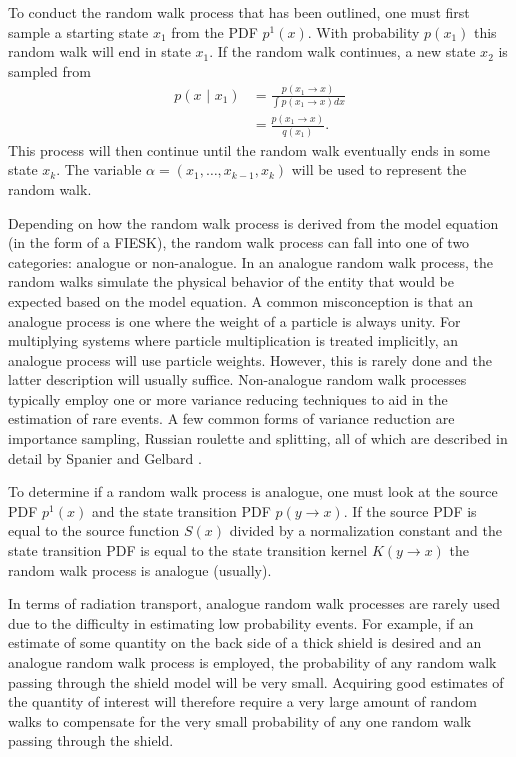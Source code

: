 To conduct the random walk process that has been outlined, one must first 
sample a starting state $x_1$ from the PDF $p^1(x)$. With probability $p(x_1)$ 
this random walk will end in state $x_1$. If the random walk continues, a new 
state $x_2$ is sampled from
\begin{align}
  p(x \text{ | } x_1) & = \frac{p(x_1 \to x)}{\int p(x_1 \to x)dx} \nonumber \\
  & = \frac{p(x_1 \to x)}{q(x_1)}.
\end{align}
This process will then continue until the random walk eventually ends in some 
state $x_k$. The variable $\alpha = (x_1,\ldots,x_{k-1},x_k)$ will be used to 
represent the random walk. 

Depending on how the random walk process is derived from the model equation (in
the form of a FIESK), the random walk process can fall into one of two 
categories: analogue or non-analogue. In an analogue random walk process, the 
random walks simulate the physical behavior of the entity that would be 
expected based on the model equation. A common misconception is that an 
analogue process is one where the weight of a particle is always unity. For 
multiplying systems where particle multiplication is treated implicitly, an 
analogue process will use particle weights. However, this is rarely done and 
the latter description will usually suffice. Non-analogue random walk processes 
typically employ one or more variance reducing techniques to aid in the 
estimation of rare events. A few common forms of variance reduction are 
importance sampling, Russian roulette and splitting, all of which are 
described in detail by Spanier and Gelbard \cite{spanier_monte_1969}. 

To determine if a random walk process is analogue, one must look at the source 
PDF $p^1(x)$ and the state transition PDF $p(y \to x)$. If the source PDF is 
equal to the source function $S(x)$ divided by a normalization constant and the 
state transition PDF is equal to the state transition kernel $K(y \to x)$ the 
random walk process is analogue (usually).

In terms of radiation transport, analogue random walk processes are 
rarely used due to the difficulty in estimating low probability events. For
example, if an estimate of some quantity on the back side of a thick shield is 
desired and an analogue random walk process is employed, the probability of any 
random walk passing through the shield model will be very small. Acquiring good
estimates of the quantity of interest will therefore require a very large
amount of random walks to compensate for the very small probability of any one
random walk passing through the shield. 

